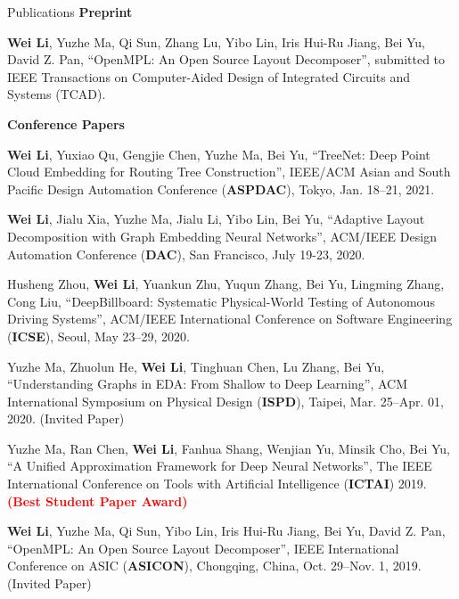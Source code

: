 \begin{rSection}{Publications}
    \textbf{Preprint}
    \begin{description}[font=\normalfont]
        \item[{[J1]}]{
            \textbf{Wei Li}, Yuzhe Ma, Qi Sun, Zhang Lu, Yibo Lin, Iris Hui-Ru Jiang, Bei Yu, David Z. Pan,
            ``OpenMPL: An Open Source Layout Decomposer'', submitted to IEEE Transactions on Computer-Aided Design of Integrated Circuits and Systems (TCAD).
        }
    
    \end{description}

\textbf{Conference Papers}
\begin{description}[font=\normalfont]
\item[{[C8]}]{
    \textbf{Wei Li}, Yuxiao Qu, Gengjie Chen, Yuzhe Ma, Bei Yu,
    ``TreeNet: Deep Point Cloud Embedding for Routing Tree Construction'', 
    IEEE/ACM Asian and South Pacific Design Automation Conference (\textbf{ASPDAC}), Tokyo, Jan. 18–21, 2021.
}
\item[{[C7]}]{
    \textbf{Wei Li}, Jialu Xia, Yuzhe Ma, Jialu Li, Yibo Lin, Bei Yu, 
    ``Adaptive Layout Decomposition with Graph Embedding Neural Networks'', 
    ACM/IEEE Design Automation Conference (\textbf{DAC}), San Francisco, July 19-23, 2020.
}
\item[{[C6]}]{
    Husheng Zhou, \textbf{Wei Li}, Yuankun Zhu, Yuqun Zhang, Bei Yu, Lingming Zhang, Cong Liu, 
    ``DeepBillboard: Systematic Physical-World Testing of Autonomous Driving Systems'', ACM/IEEE International Conference on Software Engineering (\textbf{ICSE}), Seoul, May 23–29, 2020.
}
\item[{[C5]}]{
    Yuzhe Ma, Zhuolun He, \textbf{Wei Li}, Tinghuan Chen, Lu Zhang, Bei Yu, 
    ``Understanding Graphs in EDA: From Shallow to Deep Learning'', ACM International Symposium on Physical Design (\textbf{ISPD}), Taipei, Mar. 25–Apr. 01, 2020. {(Invited Paper)}
}
\item[{[C4]}]{
    Yuzhe Ma, Ran Chen, \textbf{Wei Li}, Fanhua Shang, Wenjian Yu, Minsik Cho, Bei Yu, 
    ``A Unified Approximation Framework for Deep Neural Networks'', The IEEE International Conference on Tools with Artificial Intelligence (\textbf{ICTAI}) 2019. \textcolor{red}{\textbf{(Best Student Paper Award)}}
}
\item[{[C3]}]{
    \textbf{Wei Li}, Yuzhe Ma, Qi Sun, Yibo Lin, Iris Hui-Ru Jiang, Bei Yu, David Z. Pan,
    ``OpenMPL: An Open Source Layout Decomposer'', IEEE International Conference on ASIC (\textbf{ASICON}), Chongqing, China, Oct. 29–Nov. 1, 2019. {(Invited Paper)}
}
\end{description}
\end{rSection}
